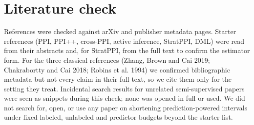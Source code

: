 \section{Literature check}
\label{app:lit}

References were checked against arXiv and publisher metadata pages. Starter references (PPI, PPI++, cross-PPI, active inference, StratPPI, DML) were read from their abstracts and, for StratPPI, from the full text to confirm the estimator form. For the three classical references (Zhang, Brown and Cai 2019; Chakrabortty and Cai 2018; Robins et al. 1994) we confirmed bibliographic metadata but not every claim in their full text, so we cite them only for the setting they treat. Incidental search results for unrelated semi-supervised papers were seen as snippets during this check; none was opened in full or used. We did not search for, open, or use any paper on shortening prediction-powered intervals under fixed labeled, unlabeled and predictor budgets beyond the starter list.

